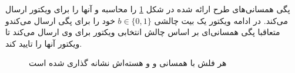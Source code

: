 \documentclass[12pt,a4paper]{article}
\begin{document}
پگی همسانی‌های طرح ارائه شده در شکل 
\ref{fig:zkp}
 را محاسبه و آنها را برای ویکتور ارسال می‌کند. در ادامه ویکتور یک بیت چالشی 
$b \in \{0,1\}$
خود را برای پگی ارسال می‌کندو متعاقبا پگی همسانی‌ای بر اساس چالش انتخابی ویکتور برای وی ارسال می‌کند تا ویکتور آنها را تایید کند.\\
\begin{figure}[H] 
	\begin{center}
		
	
	    \caption{
	هر فلش با همسانی و و هسته‌اش نشانه گذاری شده است    
    }
		\label{fig:zkp}
		
	\end{center}
\end{figure}
\end{document}
